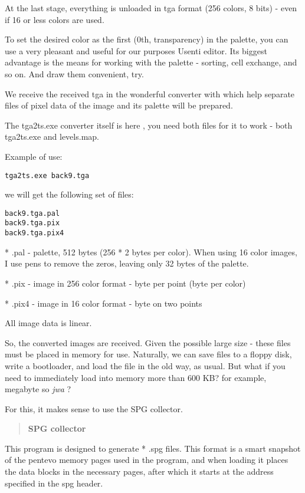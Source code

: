 \documentclass{article}
\begin{document}
At the last stage, everything is unloaded in tga format (256 colors, 8
bits) - even if 16 or less colors are used.

To set the desired color as the first (0th, transparency) in the
palette, you can use a very pleasant and useful for our purposes
Usenti editor. Its biggest advantage is the means for working with the
palette - sorting, cell exchange, and so on. And draw them convenient,
try.

We receive the received tga in the wonderful converter with which help
separate files of pixel data of the image and its palette will be
prepared.

The tga2ts.exe converter itself is here , you need both files for it
to work - both tga2ts.exe and levels.map.

Example of use:
\begin{verbatim}
tga2ts.exe back9.tga
\end{verbatim}

we will get the following set of files:

\begin{verbatim}
back9.tga.pal
back9.tga.pix
back9.tga.pix4
\end{verbatim}

* .pal - palette, 512 bytes (256 * 2 bytes per color). When using 16
color images, I use pens to remove the zeros, leaving only 32 bytes of
the palette.

* .pix - image in 256 color format - byte per point (byte per color)

* .pix4 - image in 16 color format - byte on two points

All image data is linear.

So, the converted images are received. Given the possible large size -
these files must be placed in memory for use. Naturally, we can save
files to a floppy disk, write a bootloader, and load the file in the
old way, as usual. But what if you need to immediately load into
memory more than 600 KB? for example, megabyte so \emph{jwa} ?

For this, it makes sense to use the SPG collector.

\begin{quotation}
  \textbf{SPG collector}
\end{quotation}
This program is designed to generate * .spg files. This format is a
smart snapshot of the pentevo memory pages used in the program, and
when loading it places the data blocks in the necessary pages, after
which it starts at the address specified in the spg header.
\end{document}
